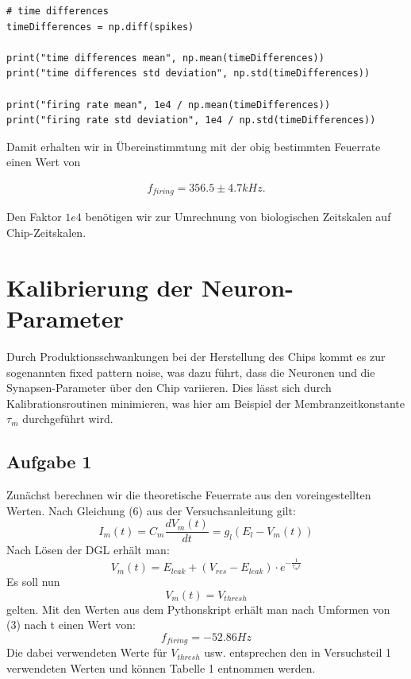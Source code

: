 \documentclass[10pt,a4paper]{scrartcl}
\begin{document}
\lstset{language=Python}
\lstset{frame=lines}
\lstset{basicstyle=\footnotesize}
\begin{lstlisting}
# time differences
timeDifferences = np.diff(spikes)

print("time differences mean", np.mean(timeDifferences))
print("time differences std deviation", np.std(timeDifferences))

print("firing rate mean", 1e4 / np.mean(timeDifferences))
print("firing rate std deviation", 1e4 / np.std(timeDifferences))
\end{lstlisting}
%

\noindent Damit erhalten wir in Übereinstimmtung mit der obig bestimmten Feuerrate einen Wert von

\begin{align*}
f_{firing} = 356.5 \pm 4.7kHz.
\end{align*}

\noindent Den Faktor $1e4$ benötigen wir zur Umrechnung von biologischen Zeitskalen auf Chip-Zeitskalen.

\newpage


\section{Kalibrierung der Neuron-Parameter}
Durch Produktionsschwankungen bei der Herstellung des Chips kommt es zur sogenannten fixed pattern noise, was dazu führt, dass die Neuronen und die Synapsen-Parameter über den Chip variieren. Dies lässt sich durch Kalibrationsroutinen minimieren, was hier am Beispiel der Membranzeitkonstante $\tau_m$ durchgeführt wird. 

\subsection{Aufgabe 1}
Zunächst berechnen wir die theoretische Feuerrate aus den voreingestellten Werten. Nach Gleichung (6) aus der Versuchsanleitung gilt:
\begin{equation}
I_m(t)=C_m\frac{dV_m(t)}{dt}=g_l(E_l- V_m(t))
\end{equation} 
Nach Lösen der DGL erhält man:
\begin{equation}
V_m(t)=E_{leak} + (V_{res}-E_{leak})\cdot e^{-\frac{1}{\tau_m t}}
\end{equation}
Es soll nun 
\begin{equation}
V_m(t)=V_{thresh}
\end{equation}
gelten. Mit den Werten aus dem Pythonskript erhält man nach Umformen von (3) nach t einen Wert von:
\begin{equation*}
f_{firing}=-52.86 Hz
\end{equation*}
Die dabei verwendeten Werte für $V_{thresh}$ usw. entsprechen den in Versuchsteil 1 verwendeten Werten und können Tabelle 1 entnommen werden.
\end{document}
